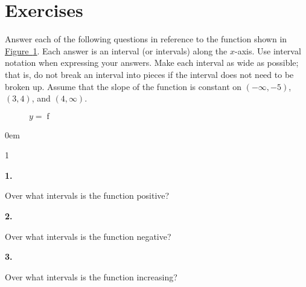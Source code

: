 \documentclass[12pt,]{book}
\theoremstyle{plain}
\theoremstyle{definition}
\numberwithin{equation}{section}
\newenvironment{exercisegroup}%
{\medskip\noindent}%
{\par\bigskip}%
\newlength{\exercisegroupindent}%
\newlength{\exercisegroupitemwidth}%
\newenvironment{exercisegrouplist}%
{\vspace{-\partopsep}%
\begin{adjustwidth}{\exercisegroupindent}{0em}}%
{\end{adjustwidth}%
\vspace{-\partopsep}%
\vspace{\baselineskip}}%
\newenvironment{exercisegroupbycol}[1]%
{\begin{exercisegrouplist}%
\vspace{-\multicolsep}%
\begin{multicols}{#1}%
\setlength{\parindent}{0em}%
\setlength{\exercisegroupitemwidth}{\linewidth}}%
{\end{multicols}%
\vspace{-\multicolsep}%
\end{exercisegrouplist}}%
\newenvironment{exercisegroupitem}[1]%
{\begin{minipage}[t]{\exercisegroupitemwidth}
\vspace{0pt}%
{\bfseries#1}%
\rule{0pt}{\baselineskip}}{\strut%
\end{minipage}%
\hspace{\columnsep}}%
\providecommand\phantomsection{}
\newcommand{\fe}[2]{\mathop{{#1}{\left(#2\right)}}}
\newcommand{\ointerval}[2]{\left(#1,#2\right)}
\begin{document}
\section*{Exercises}\label{exercises-23}

\begin{exercisegroup}%
Answer each of the following questions in reference to the function shown in \hyperref[figure-graph-features]{Figure~\ref*{figure-graph-features}}. Each answer is an interval (or intervals) along the \(x\)-axis. Use interval notation when expressing your answers. Make each interval as wide as possible; that is, do not break an interval into pieces if the interval does not need to be broken up. Assume that the slope of the function is constant on \(\ointerval{-\infty}{-5}\), \(\ointerval{3}{4}\), and \(\ointerval{4}{\infty}\).%
\begin{figure}
\centering
{
}
\caption{\(y=\fe{f}{x}\)\label{figure-graph-features}}
\end{figure}
\par
\begin{exercisegroupbycol}{1}%
\begin{exercisegroupitem}{1. }\phantomsection\hypertarget{exercise-202}{\null}
Over what intervals is the function positive?%
\end{exercisegroupitem}%
\par%
\begin{exercisegroupitem}{2. }\phantomsection\hypertarget{exercise-203}{\null}
Over what intervals is the function negative?%
\end{exercisegroupitem}%
\par%
\begin{exercisegroupitem}{3. }\phantomsection\hypertarget{exercise-204}{\null}
Over what intervals is the function increasing?%
\end{exercisegroupitem}%

\end{exercisegroupbycol}
\end{exercisegroup}
\end{document}
